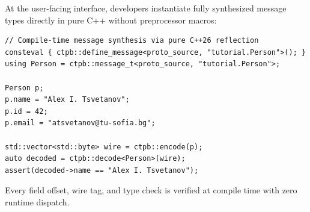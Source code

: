 At the user-facing interface, developers instantiate fully synthesized message types directly in pure C++ without preprocessor macros:
\begin{lstlisting}[language=ModernC++, caption={Zero-Macro Reflection Interface in \texttt{ctpb}}]
// Compile-time message synthesis via pure C++26 reflection
consteval { ctpb::define_message<proto_source, "tutorial.Person">(); }
using Person = ctpb::message_t<proto_source, "tutorial.Person">;

Person p;
p.name = "Alex I. Tsvetanov";
p.id = 42;
p.email = "atsvetanov@tu-sofia.bg";

std::vector<std::byte> wire = ctpb::encode(p);
auto decoded = ctpb::decode<Person>(wire);
assert(decoded->name == "Alex I. Tsvetanov");
\end{lstlisting}
Every field offset, wire tag, and type check is verified at compile time with zero runtime dispatch.
